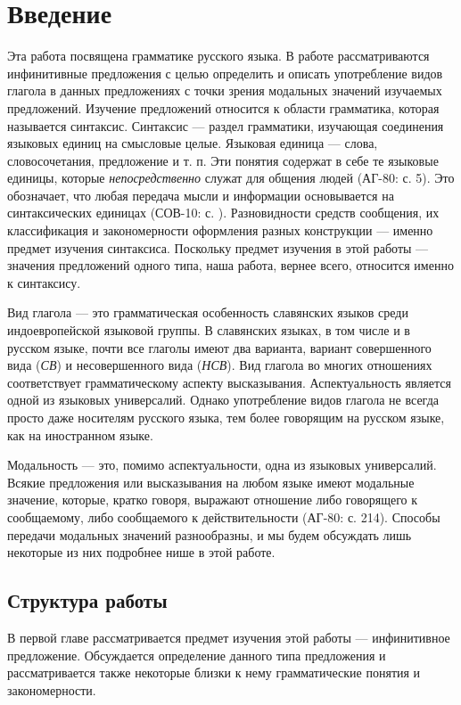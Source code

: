 \section{Введение}

Эта работа  посвящена грамматике русского языка. В работе рассматриваются инфинитивные предложения с целью определить и описать употребление видов глагола в данных предложениях с точки зрения модальных значений изучаемых предложений. Изучение предложений относится к области грамматика, которая называется синтаксис. Синтаксис --- раздел грамматики, изучающая соединения языковых единиц на смысловые целые. Языковая единица --- слова, словосочетания, предложение и т. п. Эти понятия содержат в себе те языковые единицы, которые \textit{непосредственно} служат для общения людей (АГ-80: с. 5). Это обозначает, что любая передача мысли и информации  основывается на синтаксических единицах (СОВ-10: с. ). Разновидности средств сообщения, их классификация и закономерности оформления разных конструкции --- именно предмет изучения синтаксиса. Поскольку предмет изучения в этой работы --- значения предложений одного типа, наша работа, вернее всего, относится именно к синтаксису.

Вид глагола --- это грамматическая особенность славянских языков среди индоевропейской языковой группы. В славянских языках, в том числе и в русском языке, почти все глаголы имеют два варианта, вариант совершенного вида (\textit{СВ}) и несовершенного вида (\textit{НСВ}). Вид глагола во многих отношениях соответствует грамматическому аспекту высказывания. Аспектуальность является одной из языковых универсалий. Однако употребление видов глагола не всегда просто даже носителям русского языка, тем более говорящим на русском языке, как на иностранном языке.

Модальность --- это, помимо аспектуальности, одна из языковых универсалий. Всякие предложения или высказывания на любом языке имеют модальные значение, которые, кратко говоря, выражают отношение либо говорящего к сообщаемому, либо сообщаемого к действительности (АГ-80: с. 214). Способы передачи модальных значений разнообразны, и мы будем обсуждать лишь некоторые из них подробнее нише в этой работе.

\subsection{Структура работы}

В первой главе рассматривается предмет изучения этой работы --- инфинитивное предложение. Обсуждается определение данного типа предложения и рассматривается также некоторые близки к нему грамматические понятия и закономерности.

